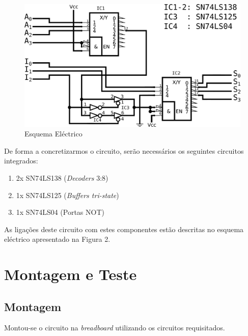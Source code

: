 \documentclass[a4paper,12pt]{article}
\begin{document}
\begin{figure}
\centering
\includegraphics[scale=.1]{esqelect.eps}
\caption{Esquema Eléctrico}
\end{figure}
\par

De forma a concretizarmos o circuito, serão necessários os seguintes 
circuitos integrados:
\begin{enumerate}
    \item 2x SN74LS138 ({\it Decoders} 3:8)
    \item 1x SN74LS125 ({\it Buffers tri-state})
    \item 1x SN74LS04  (Portas NOT)
\end{enumerate}
\par
As ligações deste circuito com estes componentes estão descritas no esquema 
eléctrico apresentado na Figura 2.
\section{Montagem e Teste}
\subsection{Montagem}
Montou-se o circuito na {\it breadboard} utilizando os circuitos requisitados.

\pagebreak
\end{document}
